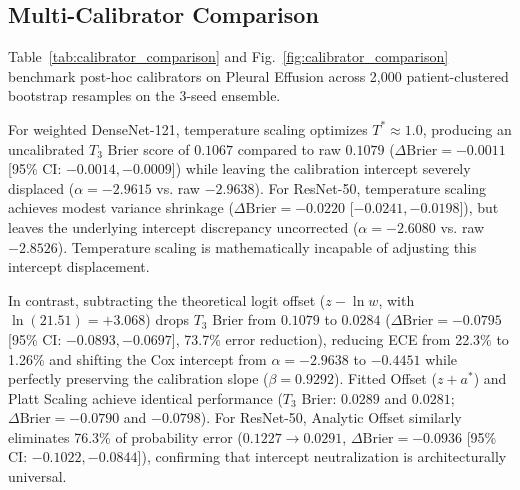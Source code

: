 \documentclass[preprint,12pt]{elsarticle}
\begin{document}
\begin{table}[!t]
\caption{Experimental Matrix Evaluation: Primary Longitudinal Performance across Architectures, Loss Objectives, and Thoracic Pathologies (Strata $T_1 \to T_3$). Values represent mean $\pm$ standard deviation across three independently trained random seeds ($S \in \{42, 123, 2026\}$). Complete 17-column trajectories across all intermediate deployment strata ($T_1, T_2, T_3$) and log-loss metrics are detailed in Supplementary Table~S3.}
\label{tab:factorial_matrix}
\centering
\small
\resizebox{\textwidth}{!}{%

}
\end{table}

\subsection{Multi-Calibrator Comparison}
Table~\ref{tab:calibrator_comparison} and Fig.~\ref{fig:calibrator_comparison} benchmark post-hoc calibrators on Pleural Effusion across 2,000 patient-clustered bootstrap resamples on the 3-seed ensemble.

\begin{table}[!t]
\caption{Multi-Calibrator Comparison on Pleural Effusion: Deidentified-Date Ensemble Performance, Calibration Intercept ($\alpha$), Slope ($\beta$), and Paired Bootstrap Contrasts. Complete 12-column factorial evaluation across all intermediate strata and log-loss is provided in Supplementary Table~S4.}
\label{tab:calibrator_comparison}
\centering
\small
\resizebox{\textwidth}{!}{%

}
\end{table}

For weighted DenseNet-121, temperature scaling optimizes $T^* \approx 1.0$, producing an uncalibrated $T_3$ Brier score of $0.1067$ compared to raw $0.1079$ ($\Delta\text{Brier} = -0.0011$ [95\% CI: $-0.0014, -0.0009$]) while leaving the calibration intercept severely displaced ($\alpha = -2.9615$ vs. raw $-2.9638$). For ResNet-50, temperature scaling achieves modest variance shrinkage ($\Delta\text{Brier} = -0.0220$ [$-0.0241, -0.0198$]), but leaves the underlying intercept discrepancy uncorrected ($\alpha = -2.6080$ vs. raw $-2.8526$). Temperature scaling is mathematically incapable of adjusting this intercept displacement.

In contrast, subtracting the theoretical logit offset ($z - \ln w$, with $\ln(21.51) = +3.068$) drops $T_3$ Brier from $0.1079$ to $0.0284$ ($\Delta\text{Brier} = -0.0795$ [95\% CI: $-0.0893, -0.0697$], 73.7\% error reduction), reducing ECE from 22.3\% to 1.26\% and shifting the Cox intercept from $\alpha = -2.9638$ to $-0.4451$ while perfectly preserving the calibration slope ($\beta = 0.9292$). Fitted Offset ($z + a^*$) and Platt Scaling achieve identical performance ($T_3$ Brier: $0.0289$ and $0.0281$; $\Delta\text{Brier} = -0.0790$ and $-0.0798$). For ResNet-50, Analytic Offset similarly eliminates 76.3\% of probability error ($0.1227 \to 0.0291$, $\Delta\text{Brier} = -0.0936$ [95\% CI: $-0.1022, -0.0844$]), confirming that intercept neutralization is architecturally universal.
\end{document}
